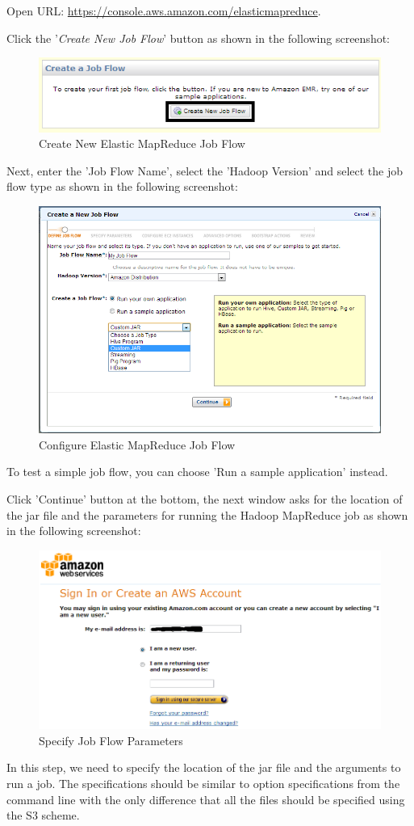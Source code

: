 Open URL: \url{https://console.aws.amazon.com/elasticmapreduce}.

Click the '\emph{Create New Job Flow}' button as shown in the following screenshot:
\begin{figure}[ht]
  \centering
  \includegraphics[width=.8\textwidth]{figs/5163os_08_23.png}
  \caption{Create New Elastic MapReduce Job Flow}\label{fig:aws.elasticmapred.createflow}
\end{figure} 
Next, enter the 'Job Flow Name', select the 'Hadoop Version' and select the job flow type as shown in the following screenshot:
\begin{figure}[ht]
  \centering
  \includegraphics[width=.8\textwidth]{figs/5163os_08_24.png}
  \caption{Configure Elastic MapReduce Job Flow}\label{fig:aws.elasticmapred.config}
\end{figure} 
To test a simple job flow, you can choose 'Run a sample application' instead.

Click 'Continue' button at the bottom, the next window asks for the location of the jar file and the parameters for running the Hadoop MapReduce job as shown in the following screenshot:
\begin{figure}[ht]
  \centering
  \includegraphics[width=.8\textwidth]{figs/5163os_08_01.png}
  \caption{Specify Job Flow Parameters}\label{fig:aws.elasticmapred.specify.param}
\end{figure} 
In this step, we need to specify the location of the jar file and the arguments to run a job. The specifications should be similar to option specifications from the command line with the only difference that all the files should be specified using the S3 scheme.

